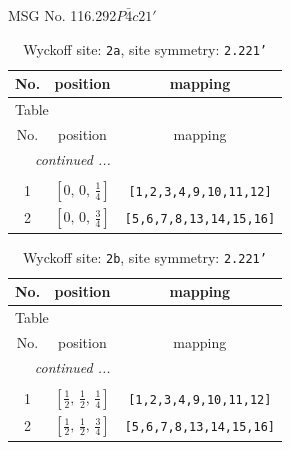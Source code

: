 \documentclass[fleqn,8pt]{jsarticle}
\begin{document}
\setcounter{MaxMatrixCols}{32}

\renewcommand{\tablename}{Table~}
\renewcommand{\figurename}{Figure~}
\begin{center}
\LARGE
MSG No. 116.292\quad$P\bar{4}c21'$
\end{center}
\renewcommand{\arraystretch}{1.2}
\begin{longtable}{ccc}
\caption{Wyckoff site: {\tt 2a}, site symmetry: {\tt 2.221'}}
 \\
 \hline \hline
No. & position & mapping \\ \hline \endfirsthead

\multicolumn{2}{l}{\tablename\ \thetable{}} \\
 \hline \hline
No. & position & mapping \\ \hline \endhead

 \hline \hline
\multicolumn{2}{r}{\footnotesize\it continued ...} \\ \endfoot

 \hline \hline
\multicolumn{2}{r}{} \\ \endlastfoot

1 & $\left[ 0,\, 0,\, \frac{1}{4} \right]$ & {\tt [1,2,3,4,9,10,11,12]} \\ \hline
2 & $\left[ 0,\, 0,\, \frac{3}{4} \right]$ & {\tt [5,6,7,8,13,14,15,16]} \\
\end{longtable}
\renewcommand{\arraystretch}{1.2}
\begin{longtable}{ccc}
\caption{Wyckoff site: {\tt 2b}, site symmetry: {\tt 2.221'}}
 \\
 \hline \hline
No. & position & mapping \\ \hline \endfirsthead

\multicolumn{2}{l}{\tablename\ \thetable{}} \\
 \hline \hline
No. & position & mapping \\ \hline \endhead

 \hline \hline
\multicolumn{2}{r}{\footnotesize\it continued ...} \\ \endfoot

 \hline \hline
\multicolumn{2}{r}{} \\ \endlastfoot

1 & $\left[ \frac{1}{2},\, \frac{1}{2},\, \frac{1}{4} \right]$ & {\tt [1,2,3,4,9,10,11,12]} \\ \hline
2 & $\left[ \frac{1}{2},\, \frac{1}{2},\, \frac{3}{4} \right]$ & {\tt [5,6,7,8,13,14,15,16]} \\
\end{longtable}
\end{document}

